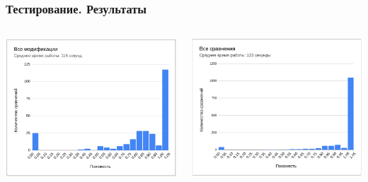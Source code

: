 \documentclass[10pt]{beamer}
\begin{document}
\begin{frame}\frametitle{Тестирование. Результаты}
	\begin{columns}
		\centering
		\includegraphics[scale=0.51]{res3.png}
		
		\centering
		\includegraphics[scale=0.51]{res4.png}
		
	\end{columns}
\end{frame}
\end{document}
